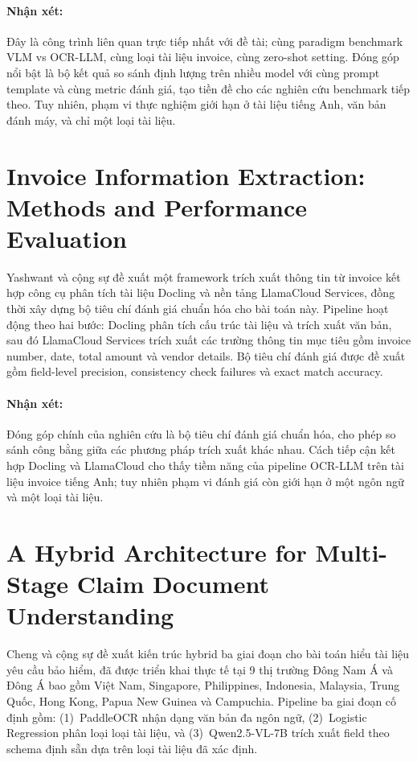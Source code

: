 ﻿\documentclass[12pt]{report}
\begin{document}
\paragraph{Nhận xét:}
Đây là công trình liên quan trực tiếp nhất với đề tài; cùng paradigm benchmark VLM vs OCR-LLM, cùng loại tài liệu invoice, cùng zero-shot setting. Đóng góp nổi bật là bộ kết quả so sánh định lượng trên nhiều model với cùng prompt template và cùng metric đánh giá, tạo tiền đề cho các nghiên cứu benchmark tiếp theo. Tuy nhiên, phạm vi thực nghiệm giới hạn ở tài liệu tiếng Anh, văn bản đánh máy, và chỉ một loại tài liệu.

\section[Invoice Information Extraction]{Invoice Information Extraction: Methods and Performance Evaluation}\label{sec:rw_yashwant}

Yashwant và cộng sự \cite{yashwant2025invoice} đề xuất một framework trích xuất thông tin từ invoice kết hợp công cụ phân tích tài liệu Docling và nền tảng LlamaCloud Services, đồng thời xây dựng bộ tiêu chí đánh giá chuẩn hóa cho bài toán này. Pipeline hoạt động theo hai bước: Docling phân tích cấu trúc tài liệu và trích xuất văn bản, sau đó LlamaCloud Services trích xuất các trường thông tin mục tiêu gồm invoice number, date, total amount và vendor details. Bộ tiêu chí đánh giá được đề xuất gồm field-level precision, consistency check failures và exact match accuracy.

\paragraph{Nhận xét:}
Đóng góp chính của nghiên cứu là bộ tiêu chí đánh giá chuẩn hóa, cho phép so sánh công bằng giữa các phương pháp trích xuất khác nhau. Cách tiếp cận kết hợp Docling và LlamaCloud cho thấy tiềm năng của pipeline OCR-LLM trên tài liệu invoice tiếng Anh; tuy nhiên phạm vi đánh giá còn giới hạn ở một ngôn ngữ và một loại tài liệu.

\section[Hybrid Architecture for Claim Document Understanding]{A Hybrid Architecture for Multi-Stage Claim Document Understanding}\label{sec:rw_cheng}

Cheng và cộng sự \cite{cheng2026hybrid} đề xuất kiến trúc hybrid ba giai đoạn cho bài toán hiểu tài liệu yêu cầu bảo hiểm, đã được triển khai thực tế tại 9 thị trường Đông Nam Á và Đông Á bao gồm Việt Nam, Singapore, Philippines, Indonesia, Malaysia, Trung Quốc, Hong Kong, Papua New Guinea và Campuchia. Pipeline ba giai đoạn cố định gồm: (1)~PaddleOCR nhận dạng văn bản đa ngôn ngữ, (2)~Logistic Regression phân loại loại tài liệu, và (3)~Qwen2.5-VL-7B trích xuất field theo schema định sẵn dựa trên loại tài liệu đã xác định.
\end{document}
